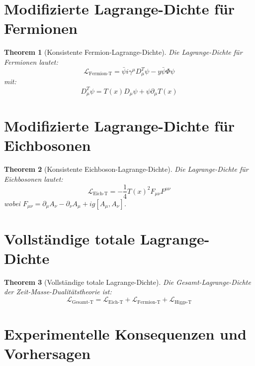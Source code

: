 \documentclass[a4paper,12pt]{article}
\newtheorem{theorem}{Theorem}[section]
\begin{document}
\section{Modifizierte Lagrange-Dichte für Fermionen}

\begin{theorem}[Konsistente Fermion-Lagrange-Dichte]
	Die Lagrange-Dichte für Fermionen lautet:
	\begin{equation}
		\mathcal{L}_{\text{Fermion-T}} = \bar{\psi} i \gamma^\mu D_\mu^T \psi - y \bar{\psi} \Phi \psi
	\end{equation}
	mit:
	\begin{equation}
		D_\mu^T \psi = T(x) D_\mu \psi + \psi \partial_\mu T(x)
	\end{equation}
\end{theorem}

\section{Modifizierte Lagrange-Dichte für Eichbosonen}

\begin{theorem}[Konsistente Eichboson-Lagrange-Dichte]
	Die Lagrange-Dichte für Eichbosonen lautet:
	\begin{equation}
		\mathcal{L}_{\text{Eich-T}} = -\frac{1}{4} T(x)^2 F_{\mu\nu} F^{\mu\nu}
	\end{equation}
	wobei \( F_{\mu\nu} = \partial_\mu A_\nu - \partial_\nu A_\mu + i g [A_\mu, A_\nu] \).
\end{theorem}

\section{Vollständige totale Lagrange-Dichte}

\begin{theorem}[Vollständige totale Lagrange-Dichte]
	Die Gesamt-Lagrange-Dichte der Zeit-Masse-Dualitätstheorie ist:
	\begin{equation}
		\mathcal{L}_{\text{Gesamt-T}} = \mathcal{L}_{\text{Eich-T}} + \mathcal{L}_{\text{Fermion-T}} + \mathcal{L}_{\text{Higgs-T}}
	\end{equation}
\end{theorem}

\section{Experimentelle Konsequenzen und Vorhersagen}
\end{document}
